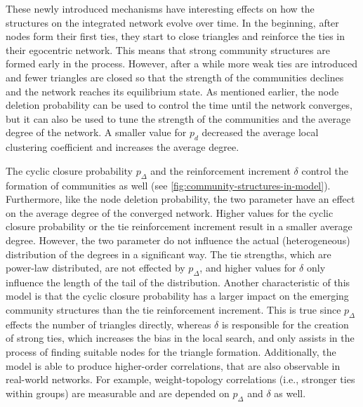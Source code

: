 These newly introduced mechanisms have interesting effects on how the structures on the integrated network evolve over time.
In the beginning, after nodes form their first ties, they start to close triangles and reinforce the ties in their egocentric network.
This means that strong community structures are formed early in the process.
However, after a while more weak ties are introduced and fewer triangles are closed so that the strength of the communities declines and the network reaches its equilibrium state.
As mentioned earlier, the node deletion probability can be used to control the time until the network converges, but it can also be used to tune the strength of the communities and the average degree of the network.
A smaller value for \( p_{d} \) decreased the average local clustering coefficient and increases the average degree.

The cyclic closure probability \( p_{\Delta} \) and the reinforcement increment \( \delta \) control the formation of communities as well (see \cref{fig:community-structures-in-model}).
Furthermore, like the node deletion probability, the two parameter have an effect on the average degree of the converged network.
Higher values for the cyclic closure probability or the tie reinforcement increment result in a smaller average degree.
However, the two parameter do not influence the actual (heterogeneous) distribution of the degrees in a significant way.
The tie strengths, which are power-law distributed, are not effected by \( p_{\Delta} \), and higher values for \( \delta \) only influence the length of the tail of the distribution.
Another characteristic of this model is that the cyclic closure probability has a larger impact on the emerging community structures than the tie reinforcement increment.
This is true since \( p_{\Delta} \) effects the number of triangles directly, whereas \( \delta \) is responsible for the creation of strong ties, which increases the bias in the local search, and only assists in the process of finding suitable nodes for the triangle formation.
Additionally, the model is able to produce higher-order correlations, that are also observable in real-world networks.
For example, weight-topology correlations (i.e., stronger ties within groups) are measurable and are depended on \( p_{\Delta} \) and \( \delta \) as well.


